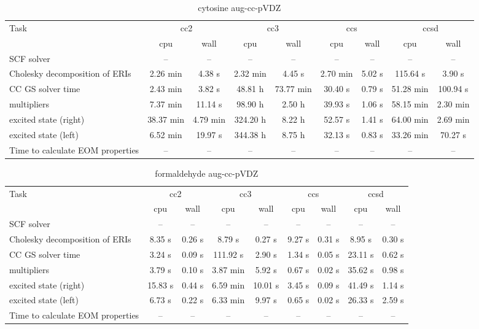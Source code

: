 \documentclass{article}
\begin{document}
\begin{table}
\caption{cytosine aug-cc-pVDZ}
\begin{tabular}{lcccccccc}
\toprule
Task & \multicolumn{2}{c}{cc2} & \multicolumn{2}{c}{cc3} & \multicolumn{2}{c}{ccs} & \multicolumn{2}{c}{ccsd}\\
\cmidrule(lr){2-3}\cmidrule(lr){4-5}\cmidrule(lr){6-7}\cmidrule(lr){8-9}
 & cpu & wall & cpu & wall & cpu & wall & cpu & wall\\
\midrule
SCF solver & -- & -- & -- & -- & -- & -- & -- & --\\
Cholesky decomposition of ERIs & 2.26 min & 4.38 s & 2.32 min & 4.45 s & 2.70 min & 5.02 s & 115.64 s & 3.90 s\\
CC GS solver time & 2.43 min & 3.82 s & 48.81 h & 73.77 min & 30.40 s & 0.79 s & 51.28 min & 100.94 s\\
multipliers & 7.37 min & 11.14 s & 98.90 h & 2.50 h & 39.93 s & 1.06 s & 58.15 min & 2.30 min\\
excited state (right) & 38.37 min & 4.79 min & 324.20 h & 8.22 h & 52.57 s & 1.41 s & 64.00 min & 2.69 min\\
excited state (left) & 6.52 min & 19.97 s & 344.38 h & 8.75 h & 32.13 s & 0.83 s & 33.26 min & 70.27 s\\
Time to calculate EOM properties & -- & -- & -- & -- & -- & -- & -- & --\\
\bottomrule
\end{tabular}
\end{table}
\begin{table}
\caption{formaldehyde aug-cc-pVDZ}
\begin{tabular}{lcccccccc}
\toprule
Task & \multicolumn{2}{c}{cc2} & \multicolumn{2}{c}{cc3} & \multicolumn{2}{c}{ccs} & \multicolumn{2}{c}{ccsd}\\
\cmidrule(lr){2-3}\cmidrule(lr){4-5}\cmidrule(lr){6-7}\cmidrule(lr){8-9}
 & cpu & wall & cpu & wall & cpu & wall & cpu & wall\\
\midrule
SCF solver & -- & -- & -- & -- & -- & -- & -- & --\\
Cholesky decomposition of ERIs & 8.35 s & 0.26 s & 8.79 s & 0.27 s & 9.27 s & 0.31 s & 8.95 s & 0.30 s\\
CC GS solver time & 3.24 s & 0.09 s & 111.92 s & 2.90 s & 1.34 s & 0.05 s & 23.11 s & 0.62 s\\
multipliers & 3.79 s & 0.10 s & 3.87 min & 5.92 s & 0.67 s & 0.02 s & 35.62 s & 0.98 s\\
excited state (right) & 15.83 s & 0.44 s & 6.59 min & 10.01 s & 3.45 s & 0.09 s & 41.49 s & 1.14 s\\
excited state (left) & 6.73 s & 0.22 s & 6.33 min & 9.97 s & 0.65 s & 0.02 s & 26.33 s & 2.59 s\\
Time to calculate EOM properties & -- & -- & -- & -- & -- & -- & -- & --\\
\bottomrule
\end{tabular}
\end{table}
\end{document}

